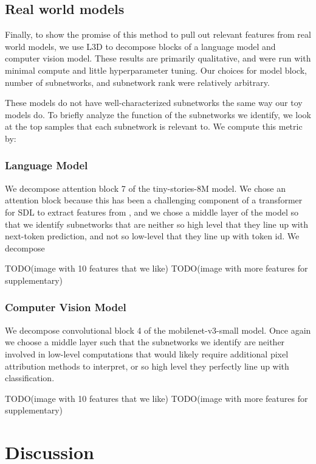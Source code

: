 \documentclass{article}
\theoremstyle{plain}
\theoremstyle{definition}
\theoremstyle{remark}
\begin{document}
\subsection{Real world models}

Finally, to show the promise of this method to pull out relevant features from real world models, we use L3D to decompose blocks of a language model and computer vision model.  These results are primarily qualitative, and were run with minimal compute and little hyperparameter tuning. Our choices for model block, number of subnetworks, and subnetwork rank were relatively arbitrary.  

These models do not have well-characterized subnetworks the same way our toy models do. To briefly analyze the function of the subnetworks we identify, we look at the top samples that each subnetwork is relevant to.  We compute this metric by:


\subsubsection{Language Model}

We decompose attention block 7 of the tiny-stories-8M model.  We chose an attention block because this has been a challenging component of a transformer for SDL to extract features from \cite{}, and we chose a middle layer of the model so that we identify subnetworks that are neither so high level that they line up  with next-token prediction, and not so low-level that they line up with token id. We decompose 

TODO(image with 10 features that we like)
TODO(image with more features for supplementary)


\subsubsection{Computer Vision Model}

We decompose convolutional block 4 of the mobilenet-v3-small model.  Once again we choose a middle layer such that the subnetworks we identify are neither involved in low-level computations that would likely require additional pixel attribution methods to interpret, or so high level they perfectly line up with classification. 

TODO(image with 10 features that we like)
TODO(image with more features for supplementary)

\section{Discussion}
\end{document}

